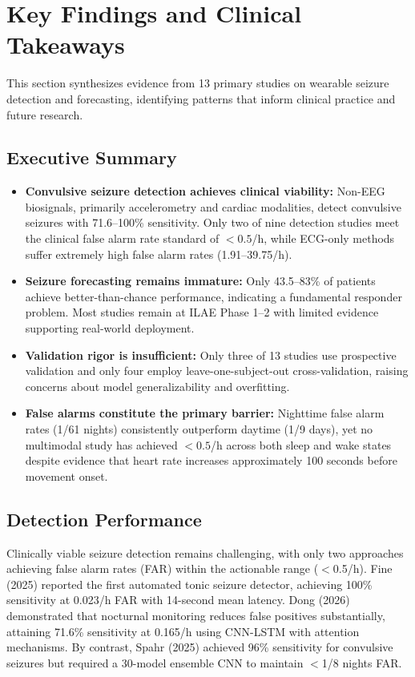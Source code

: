 \section{Key Findings and Clinical Takeaways}

This section synthesizes evidence from 13 primary studies on wearable seizure detection and forecasting, identifying patterns that inform clinical practice and future research.

\subsection{Executive Summary}

\begin{itemize}
    \item \textbf{Convulsive seizure detection achieves clinical viability:} Non-EEG biosignals, primarily accelerometry and cardiac modalities, detect convulsive seizures with 71.6--100\% sensitivity. Only two of nine detection studies meet the clinical false alarm rate standard of $<0.5$/h, while ECG-only methods suffer extremely high false alarm rates (1.91--39.75/h).

    \item \textbf{Seizure forecasting remains immature:} Only 43.5--83\% of patients achieve better-than-chance performance, indicating a fundamental responder problem. Most studies remain at ILAE Phase 1--2 with limited evidence supporting real-world deployment.

    \item \textbf{Validation rigor is insufficient:} Only three of 13 studies use prospective validation and only four employ leave-one-subject-out cross-validation, raising concerns about model generalizability and overfitting.

    \item \textbf{False alarms constitute the primary barrier:} Nighttime false alarm rates (1/61 nights) consistently outperform daytime (1/9 days), yet no multimodal study has achieved $<0.5$/h across both sleep and wake states despite evidence that heart rate increases approximately 100 seconds before movement onset.
\end{itemize}

\subsection{Detection Performance}

Clinically viable seizure detection remains challenging, with only two approaches achieving false alarm rates (FAR) within the actionable range ($<$0.5/h). Fine (2025) reported the first automated tonic seizure detector, achieving 100\% sensitivity at 0.023/h FAR with 14-second mean latency. Dong (2026) demonstrated that nocturnal monitoring reduces false positives substantially, attaining 71.6\% sensitivity at 0.165/h using CNN-LSTM with attention mechanisms. By contrast, Spahr (2025) achieved 96\% sensitivity for convulsive seizures but required a 30-model ensemble CNN to maintain $<$1/8 nights FAR.

